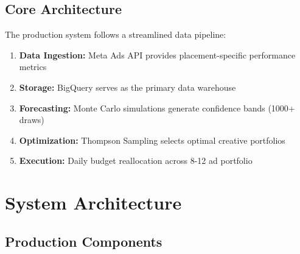 \documentclass[11pt,a4paper]{report}
\begin{document}
\section{Core Architecture}

The production system follows a streamlined data pipeline:

\begin{enumerate}
\item \textbf{Data Ingestion:} Meta Ads API provides placement-specific performance metrics
\item \textbf{Storage:} BigQuery serves as the primary data warehouse
\item \textbf{Forecasting:} Monte Carlo simulations generate confidence bands (1000+ draws)
\item \textbf{Optimization:} Thompson Sampling selects optimal creative portfolios
\item \textbf{Execution:} Daily budget reallocation across 8-12 ad portfolio
\end{enumerate}

\clearpage

\chapter{System Architecture}

\section{Production Components}
\end{document}
